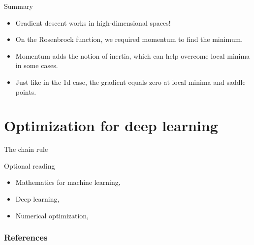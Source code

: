 \documentclass[notes]{beamer}
\begin{document}

    \begin{frame}{Summary}
      \begin{itemize}
        \item Gradient descent works in high-dimensional spaces!
        \item On the Rosenbrock function, we required momentum to find the minimum.
        \item Momentum adds the notion of inertia, which can help overcome local minima in some cases.
        \item Just like in the 1d case, the gradient equals zero at local minima and saddle points.
      \end{itemize}
    \end{frame}

    \section{Optimization for deep learning}
    \begin{frame}{The chain rule}
    \end{frame}


    \begin{frame}{Optional reading}
      \begin{itemize}
        \item Mathematics for machine learning, \cite[Chapter 5, Vector Calculus]{deisenroth2020mathematics}
        \item Deep learning, \cite[Chapter 8.2, Automatic Differentiation]{wright1999numerical}
        \item Numerical optimization, \cite[Chapter 8, Optimization for Training Deep Models]{goodfellow2016deep}
      \end{itemize}
    \end{frame}

    \begin{frame}
      \frametitle{References}
      \renewcommand*{\bibfont}{\scriptsize}
      \printbibliography
  \end{frame}
\end{document}
